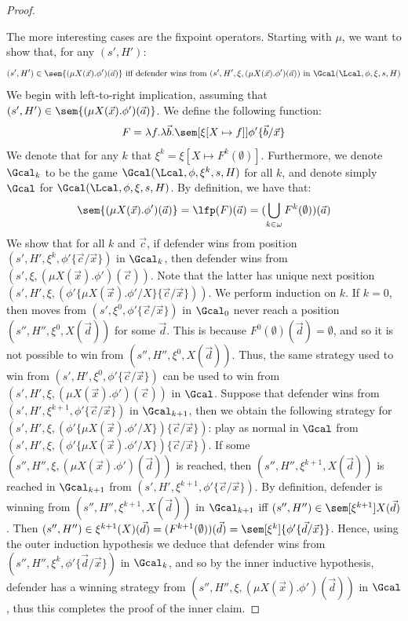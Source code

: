 \begin{proof}
\begin{itemize}
	\end{itemize}
		The more interesting cases are the fixpoint operators.
	Starting with $\mu$, we want to show that, for any $(s', H')$:
	\[
	(s', H')\in \sem{(\mu X(\vec x).\phi')(\vec a)} \text{ iff defender wins from } (s', H', \xi, (\mu X(\vec x).\phi')(\vec a)) \text{ in } \Gcal(\Lcal, \phi, \xi, s, H)
	\]
	We begin with left-to-right implication, assuming that $(s', H') \in \sem{(\mu X(\vec x).\phi')(\vec a)}$. 
	We define the following function:	\[
	F = \lambda f.\lambda \vec b.\sem[{\xi[X \mapsto f]}]{\phi'\{\vec b / \vec x\}}
	\]
	We denote that for any $k$ that $\xi^k = \xi[X \mapsto F^k(\emptyset)]$.
	Furthermore, we denote $\Gcal_{k}$ to be the game $\Gcal(\Lcal, \phi, \xi^k, s, H)$ for all $k$, and denote simply $\Gcal$ for $\Gcal(\Lcal, \phi, \xi, s, H)$.
	By definition, we have that:
	\[
	\sem{(\mu X(\vec x).\phi')(\vec a)} = \lfp(F)(\vec a) = (\bigcup_{k \in \omega} F^k(\emptyset))(\vec a)
	\]
	We show that for all $k$ and $\vec c$, if defender wins from position $(s', H', \xi^k, \phi'\{\vec c/\vec x\})$ in $\Gcal_k$,
	then defender wins from $(s', \xi, (\mu X(\vec x).\phi')(\vec c))$.
	Note that the latter has unique next position $(s', H', \xi, (\phi'\{\mu X(\vec x).\phi' / X\}\{\vec c / \vec x\}))$. 
	We perform induction on $k$. 
	If $k = 0$, then moves from $(s', \xi^0, \phi'\{\vec c / \vec x\})$ in $\Gcal_0$ never reach a position $(s'',H'', \xi^0, X(\vec d))$ for some $\vec d$. 
	This is because $F^0(\emptyset)(\vec d) = \emptyset$, and so it is not possible to win from $(s'', H'', \xi^0, X(\vec d))$.
	Thus, the same strategy used to win from $(s', H', \xi^0, \phi'\{\vec c / \vec x\})$ can be used to win from $(s', H', \xi, (\mu X(\vec x).\phi')(\vec c))$ in $\Gcal$.
	Suppose that defender wins from $(s', H', \xi^{k + 1}, \phi'\{\vec c / \vec x\})$ in $\Gcal_{k + 1}$, then we obtain the following strategy for $(s', H', \xi, (\phi'\{\mu X(\vec x).\phi' / X\})\{\vec c / \vec x\})$:
	play as normal in $\Gcal$ from $(s', H', \xi, (\phi'\{\mu X(\vec x).\phi' / X\})\{\vec c / \vec x\})$.
	If some $(s'', H'', \xi, (\mu X(\vec x).\phi')(\vec d))$ is reached, then $(s'', H'', \xi^{k + 1}, X(\vec d))$ is reached in $\Gcal_{k + 1}$ from $(s', H', \xi^{k+1}, \phi'\{\vec c / \vec x\})$. 
	By definition, defender is winning from $(s'', H'', \xi^{k + 1}, X(\vec d))$ in $\Gcal_{k+1}$ iff $(s'', H'')\in \sem[\xi^{k + 1}]{X(\vec d)}$.
	Then $(s'', H'') \in \xi^{k + 1}(X)(\vec d) = (F^{k + 1}(\emptyset))(\vec d) = \sem[\xi^k]{\phi'\{\vec d / \vec x\}}$.
	Hence, using the outer induction hypothesis we deduce that defender wins from $(s'', H'',\xi^k, \phi'\{\vec d / \vec x\})$ in $\Gcal_k$, and so by the inner inductive hypothesis, defender has a winning strategy from $(s'', H'', \xi, (\mu X(\vec x).\phi')(\vec d))$ in $\Gcal$, thus this completes the proof of the inner claim.

\end{proof}
